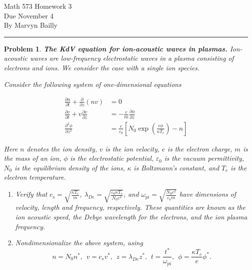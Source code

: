 \documentclass[12pt]{report}
\newtheorem{problem}{Problem}
\newcommand{\pp}[2]{\frac{\partial #1}{\partial #2}} %
\newcommand{\ppn}[3]{\frac{\partial^{#1} #2}{\partial #3^{#1}}} %
\begin{document}
\large

\begin{center}
 Math 573 Homework 3\\
 Due November 4\\
 By Marvyn Bailly\\
\end{center}

\normalsize

\hrule



\begin{problem}
    {\bf The KdV equation for ion-acoustic waves in plasmas.} Ion-acoustic waves
are low-frequency electrostatic waves in a plasma consisting of electrons and ions. We
consider the case with a single ion species.

Consider the following system of one-dimensional equations

\begin{align*}
    \pp{n}{t}+\pp{}{z}(nv)&=0\\
    \pp{v}{t}+v\pp{v}{z}&=-\frac{e}{m}\pp{\phi}{z}\\
    \ppn{2}{\phi}{z}&= \frac{e}{\varepsilon_0}\left[N_0 \exp\left(\frac{e\phi}{\kappa T_e}\right)-n\right]
\end{align*}


Here $n$ denotes the ion density, $v$ is the ion velocity, $e$ is the electron charge, $m$ is the
mass of an ion, $\phi$ is the electrostatic potential, $\varepsilon_0$ is the vacuum permittivity, $N_0$ is the
equilibrium density of the ions, $\kappa$ is Boltzmann's constant, and $T_e$ is the electron temperature.

\begin{enumerate}

\item[{\bf a}] Verify that $c_s=\sqrt{\frac{\kappa T_e}{m}}$,
$\lambda_{De}=\sqrt{\frac{\varepsilon_0 \kappa T_e}{N_0 e^2}}$, and
$\omega_{pi}=\sqrt{\frac{N_0 e^2}{\varepsilon_0 m}}$ have dimensions of velocity,
length and frequency, respectively. These quantities are known as the ion acoustic speed, the Debye
wavelength for the electrons, and the ion plasma frequency.

\item[{\bf b}] Nondimensionalize the above system, using
\[
n=N_0 n^*, ~~v=c_s v^*, ~~z=\lambda_{De} z^*, ~~t=\frac{t^*}{\omega_{pi}}, ~~\phi=\frac{\kappa T_e}{e} \phi^*.
\]


\end{enumerate}
\end{problem}
\end{document}
